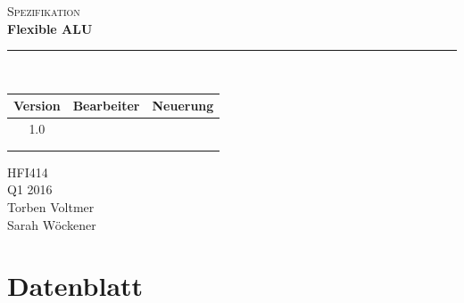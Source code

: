 \documentclass[11pt]{report}
\newcommand{\HRule}[1]{\rule{\linewidth}{#1}} 	%
\begin{document}
	\begin{titlepage}
		\begin{center}
			\textsc{\Large Spezifikation}\\
			
			{ \huge \bfseries Flexible ALU \\[0.4cm] }
			\HRule{0.5pt} \\[2.5cm]			
		\end{center}
		
		\begin{table}[h]
			\centering
			\begin{tabular}{l|l|l}
				\multicolumn{1}{c|}{\Large \textbf{  Version  }} & \multicolumn{1}{c|}{\Large \textbf{  Bearbeiter  }} & \multicolumn{1}{c}{\Large \textbf{  Neuerung  }} \\ \hline
				\multicolumn{1}{c|}{1.0}              & \multicolumn{1}{c|}{}                    & \multicolumn{1}{c}{}                  \\
				&                                          &                                       \\
				&                                          &                                      
			\end{tabular}
		\end{table}
		
		\vfill
		\begin{flushright}
			HFI414\\
			Q1 2016\\
			Torben Voltmer\\
			Sarah Wöckener\\
		\end{flushright}
	\end{titlepage}
	\tableofcontents
	
	\pagebreak

	\chapter{Datenblatt}
	
\end{document}
